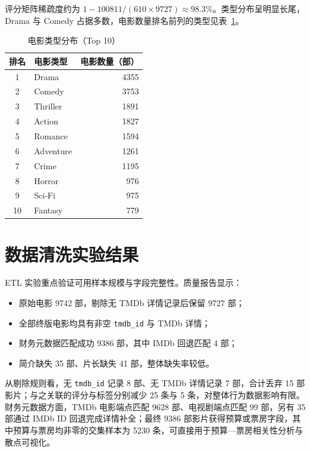 评分矩阵稀疏度约为 $1 - 100811/(610 \times 9727) \approx 98.3\%$。类型分布呈明显长尾，Drama 与 Comedy 占据多数，电影数量排名前列的类型见表~\ref{tab:genre-top}。

\begin{table}[H]
    \centering
    \caption{电影类型分布（Top 10）} \label{tab:genre-top}
    \renewcommand{\arraystretch}{1.2}
    \setlength{\tabcolsep}{10pt}
    \begin{tabular}{|c|l|r|}
        \hline
        \textbf{排名} & \textbf{电影类型} & \textbf{电影数量（部）} \\
        \hline
        1  & Drama     & 4355 \\
        \hline
        2  & Comedy    & 3753 \\
        \hline
        3  & Thriller  & 1891 \\
        \hline
        4  & Action    & 1827 \\
        \hline
        5  & Romance   & 1594 \\
        \hline
        6  & Adventure & 1261 \\
        \hline
        7  & Crime     & 1195 \\
        \hline
        8  & Horror    & 976 \\
        \hline
        9  & Sci-Fi    & 975 \\
        \hline
        10 & Fantasy   & 779 \\
        \hline
    \end{tabular}
\end{table}

\section{数据清洗实验结果}
\label{sec:exp:etl}

ETL 实验重点验证可用样本规模与字段完整性。质量报告显示：

\begin{itemize}
    \item 原始电影 9742 部，剔除无 TMDb 详情记录后保留 9727 部；
    \item 全部终版电影均具有非空 \texttt{tmdb\_id} 与 TMDb 详情；
    \item 财务元数据匹配成功 9386 部，其中 IMDb 回退匹配 4 部；
    \item 简介缺失 35 部、片长缺失 41 部，整体缺失率较低。
\end{itemize}

从剔除规则看，无 \texttt{tmdb\_id} 记录 8 部、无 TMDb 详情记录 7 部，合计丢弃 15 部影片；与之关联的评分与标签分别减少 25 条与 5 条，对整体行为数据影响有限。财务元数据方面，TMDb 电影端点匹配 9628 部、电视剧端点匹配 99 部，另有 35 部通过 IMDb ID 回退完成详情补全；最终 9386 部影片获得预算或票房字段，其中预算与票房均非零的交集样本为 5230 条，可直接用于预算—票房相关性分析与散点可视化。

